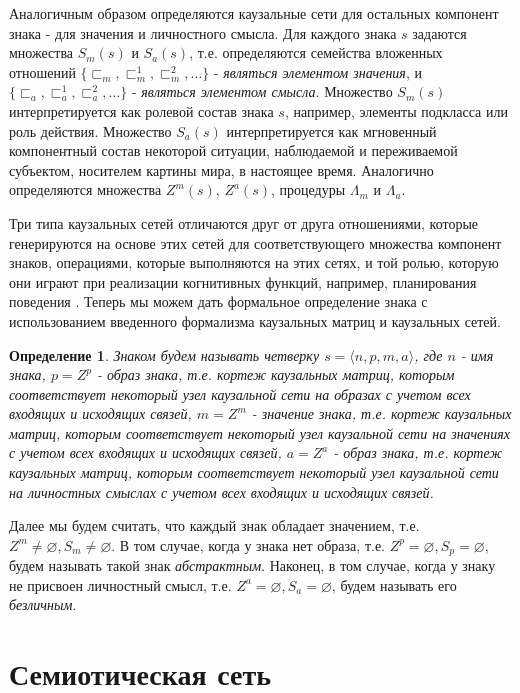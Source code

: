 \documentclass[12pt]{scrartcl}
\newtheorem{definition}{Определение}
\begin{document}
	Аналогичным образом определяются каузальные сети для остальных компонент знака - для значения и личностного смысла. Для каждого знака $s$ задаются множества $S_m(s)$ и $S_a(s)$, т.е. определяются семейства вложенных отношений $\{\sqsubset_m,\sqsubset_m^1,\sqsubset_m^2,\dots\}$ - \textit{являться элементом значения}, и $\{\sqsubset_a,\sqsubset_a^1,\sqsubset_a^2,\dots\}$ - \textit{являться элементом смысла}. Множество $S_m(s)$ интерпретируется как ролевой состав знака $s$, например, элементы подкласса или роль действия. Множество $S_a(s)$ интерпретируется как мгновенный компонентный состав некоторой ситуации, наблюдаемой и переживаемой субъектом, носителем картины мира, в настоящее время. Аналогично определяются множества $Z^m(s)$, $Z^a(s)$, процедуры $\Lambda_m$ и $\Lambda_a$.
	
	Три типа каузальных сетей отличаются друг от друга отношениями, которые генерируются на основе этих сетей для соответствующего множества компонент знаков, операциями, которые выполняются на этих сетях, и той ролью, которую они играют при реализации когнитивных функций, например, планирования поведения \cite{Osipov2015d}. Теперь мы можем дать формальное определение знака \cite{Osipov2015c} с использованием введенного формализма каузальных матриц и каузальных сетей.
	
	\begin{definition}
		Знаком будем называть четверку $s=\langle n, p, m, a \rangle$, где $n$ - имя знака, $p=Z^p$ - образ знака, т.е. кортеж каузальных матриц, которым соответствует некоторый узел каузальной сети на образах с учетом всех входящих и исходящих связей, $m=Z^m$ - значение знака, т.е. кортеж каузальных матриц, которым соответствует некоторый узел каузальной сети на значениях  с учетом всех входящих и исходящих связей, $a=Z^a$ - образ знака, т.е. кортеж каузальных матриц, которым соответствует некоторый узел каузальной сети на личностных смыслах  с учетом всех входящих и исходящих связей.
	\end{definition}
	
	Далее мы будем считать, что каждый знак обладает значением, т.е. $Z^m\not = \varnothing, S_m\not=\varnothing$. В том случае, когда у знака нет образа, т.е. $Z^p=\varnothing,S_p=\varnothing$, будем называть такой знак \textit{абстрактным}. Наконец, в том случае, когда у знаку не присвоен личностный смысл, т.е. $Z^a=\varnothing, S_a=\varnothing$, будем называть его \textit{безличным}.
	
	\section{Семиотическая сеть}
	
\end{document}
